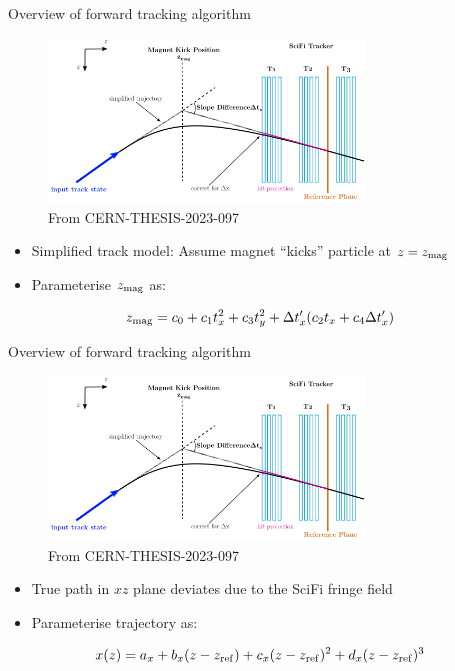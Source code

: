 \documentclass[xcolor={dvipsnames}]{beamer}
\begin{document}
\begin{frame}{Overview of forward tracking algorithm}
  \vspace{0.0cm}
  \begin{figure}[htb]
    \centering
    \includegraphics[width=0.75\textwidth]{Plots/MagnetKinkPosition.png}
    \caption*{\small From CERN-THESIS-2023-097}
  \end{figure}

  \begin{itemize}
    \item{Simplified track model: Assume magnet ``kicks'' particle at $z = z_{\rm mag}$}
    \item{Parameterise $z_{\rm mag}$ as:}
  \end{itemize}
  \begin{equation*}
    z_{\rm mag} = c_0 + c_1t_x^2 + c_3t_y^2 + \Delta t_x^\prime(c_2t_x + c_4\Delta t_x^\prime)
  \end{equation*}
\end{frame}

\begin{frame}{Overview of forward tracking algorithm}
  \vspace{0.0cm}
  \begin{figure}[htb]
    \centering
    \includegraphics[width=0.75\textwidth]{Plots/MagnetKinkPosition.png}
    \caption*{\small From CERN-THESIS-2023-097}
  \end{figure}
  \begin{itemize}
    \item{True path in $xz$ plane deviates due to the SciFi fringe field}
    \item{Parameterise trajectory as:}
  \end{itemize}
  \begin{equation*}
    x(z) = a_x + b_x(z - z_{\rm ref}) + c_x(z - z_{\rm ref})^2 + d_x(z - z_{\rm ref})^3
  \end{equation*}
\end{frame}
\end{document}
